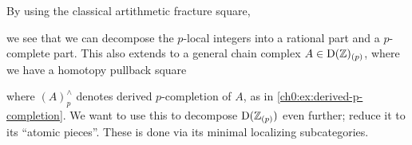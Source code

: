 



By using the classical artithmetic fracture square, 
\begin{center}
\end{center}
we see that we can decompose the $p$-local integers into a rational part and a $p$-complete part. This also extends to a general chain complex $A\in \mathrm{D}(\mathbb{Z})_{(p)}$, where we have a homotopy pullback square 
\begin{center}
\end{center}
where $(A)_p^\wedge$ denotes derived $p$-completion of $A$, as in \cref{ch0:ex:derived-p-completion}. We want to use this to decompose $\mathrm{D}(\mathbb{Z}_{(p)})$ even further; reduce it to its ``atomic pieces''. These is done via its minimal localizing subcategories. 

